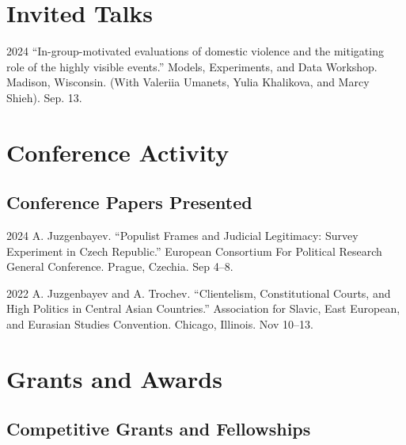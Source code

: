 \documentclass[11pt,letterpaper]{report}
\begin{document}
    \section*{Invited Talks}

   \begin{tablist}

     \item[2024] \tab{}\enquote{In-group-motivated evaluations of domestic violence and the mitigating role of the highly visible events.} Models, Experiments, and Data Workshop. Madison, Wisconsin. (With Valeriia Umanets, Yulia Khalikova, and Marcy Shieh). Sep. 13.

    \end{tablist}

    


    \section*{Conference Activity}

    

    \subsection*{Conference Papers Presented}

    \begin{tablist}

        \item[2024] \tab{}A. Juzgenbayev. \enquote{Populist Frames and Judicial Legitimacy: Survey Experiment in Czech Republic.} European Consortium For Political Research General Conference.  Prague, Czechia. Sep 4--8. 

        \item[2022] \tab{}A. Juzgenbayev and A. Trochev. \enquote{Clientelism, Constitutional Courts, and High Politics in Central Asian Countries.} Association for Slavic, East European, and Eurasian Studies Convention. Chicago, Illinois. Nov 10--13.

    \end{tablist}



    \section*{Grants and Awards}



    \subsection*{Competitive Grants and Fellowships}
\end{document}
